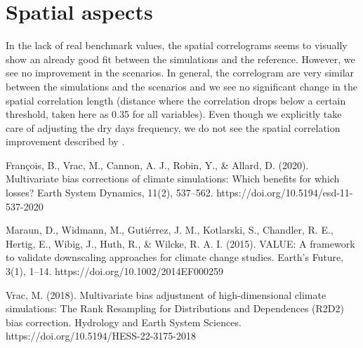 \documentclass[letterpaper,10pt]{article}
\begin{document}
\section{Spatial aspects}
In the lack of real benchmark values, the spatial correlograms seems to visually show an already good fit between the simulations and the reference. However, we see no improvement in the scenarios. In general, the correlogram are very similar between the simulations and the scenarios and we see no significant change in the spatial correlation length (distance where the correlation drops below a certain threshold, taken here as 0.35 for all variables). Even though we explicitly take care of adjusting the dry days frequency, we do not see the spatial correlation improvement described by \cite{Francois2020}.


\begin{thebibliography}{6}
 François, B., Vrac, M., Cannon, A. J., Robin, Y., \& Allard, D. (2020). Multivariate bias corrections of climate simulations: Which benefits for which losses? Earth System Dynamics, 11(2), 537–562. https://doi.org/10.5194/esd-11-537-2020

 Maraun, D., Widmann, M., Gutiérrez, J. M., Kotlarski, S., Chandler, R. E., Hertig, E., Wibig, J., Huth, R., \& Wilcke, R. A. I. (2015). VALUE: A framework to validate downscaling approaches for climate change studies. Earth’s Future, 3(1), 1–14. https://doi.org/10.1002/2014EF000259

 Vrac, M. (2018). Multivariate bias adjustment of high-dimensional climate simulations: The Rank Resampling for Distributions and Dependences (R2D2) bias correction. Hydrology and Earth System Sciences. https://doi.org/10.5194/HESS-22-3175-2018


\end{thebibliography}
\end{document}
